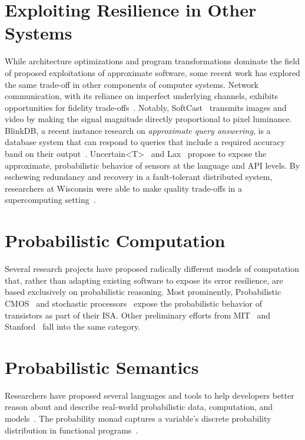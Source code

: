 \section{Exploiting Resilience in Other Systems}

While architecture optimizations and program transformations dominate the
field of proposed exploitations of approximate software, some recent work has
explored the same trade-off in other components of computer systems. Network
communication, with its reliance on imperfect underlying channels, exhibits
opportunities for fidelity trade-offs~\cite{softcast, luo-globecom, apex,
smpmup2006}. Notably, SoftCast~\cite{softcast} transmits images and video by
making the signal magnitude directly proportional to pixel luminance. BlinkDB,
a recent instance research on \emph{approximate query answering},
is a database system that can respond to queries that include a required
accuracy band on their output~\cite{blinkdb}.
Uncertain{\textless}T{\textgreater}~\cite{uncertaint} and Lax~\cite{lax}
propose to expose the approximate, probabilistic behavior of sensors at the
language and API levels.
By eschewing redundancy and
recovery in a fault-tolerant distributed system, researchers at Wisconsin were
able to make quality trade-offs in a supercomputing
setting~\cite{dekruijf-icpp}.


\section{Probabilistic Computation}

Several research projects have proposed radically different models of
computation that, rather than adapting existing software to expose its error
resilience, are based exclusively on probabilistic reasoning. Most
prominently, Probabilistic CMOS~\cite{pcmos, pcmos-cacm, palem-dac-position}
and stochastic processors~\cite{stochasticproc} expose the probabilistic
behavior of transistors as part of their ISA.
Other preliminary efforts from MIT~\cite{batesmit, lyric, mansinghka-circuits} and
Stanford~\cite{ersa} fall into the same category.

\section{Probabilistic Semantics}


Researchers have proposed several languages and tools to
help developers better reason about and describe real-world
probabilistic data, computation, and models~\cite{BBGR13,
  wingate-lightweight, church, chaganty, pfeffersample, pmonad,
  infernet, probdsl,uncertaint}.
The probability monad captures a variable's discrete probability
distribution in functional programs~\cite{pmonad}.

